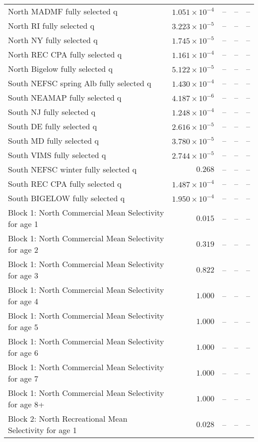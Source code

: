 \documentclass[
]{article}
\begin{document}
\begin{landscape}
\begin{longtable}[t]{lrrrr}
North MADMF fully selected q & $1.051\times 10^{-4}$ & -- & -- & --\\
North RI fully selected q & $3.223\times 10^{-5}$ & -- & -- & --\\
North NY fully selected q & $1.745\times 10^{-5}$ & -- & -- & --\\
\addlinespace
North REC CPA fully selected q & $1.161\times 10^{-4}$ & -- & -- & --\\
North Bigelow fully selected q & $5.122\times 10^{-5}$ & -- & -- & --\\
South NEFSC spring Alb fully selected q & $1.430\times 10^{-4}$ & -- & -- & --\\
South NEAMAP fully selected q & $4.187\times 10^{-6}$ & -- & -- & --\\
South NJ fully selected q & $1.248\times 10^{-4}$ & -- & -- & --\\
\addlinespace
South DE fully selected q & $2.616\times 10^{-5}$ & -- & -- & --\\
South MD fully selected q & $3.780\times 10^{-5}$ & -- & -- & --\\
South VIMS fully selected q & $2.744\times 10^{-5}$ & -- & -- & --\\
South NEFSC winter fully selected q & $0.268$ & -- & -- & --\\
South REC CPA fully selected q & $1.487\times 10^{-4}$ & -- & -- & --\\
\addlinespace
South BIGELOW fully selected q & $1.950\times 10^{-4}$ & -- & -- & --\\
Block 1: North Commercial Mean Selectivity for age 1 & $0.015$ & -- & -- & --\\
Block 1: North Commercial Mean Selectivity for age 2 & $0.319$ & -- & -- & --\\
Block 1: North Commercial Mean Selectivity for age 3 & $0.822$ & -- & -- & --\\
Block 1: North Commercial Mean Selectivity for age 4 & $1.000$ & -- & -- & --\\
\addlinespace
Block 1: North Commercial Mean Selectivity for age 5 & $1.000$ & -- & -- & --\\
Block 1: North Commercial Mean Selectivity for age 6 & $1.000$ & -- & -- & --\\
Block 1: North Commercial Mean Selectivity for age 7 & $1.000$ & -- & -- & --\\
Block 1: North Commercial Mean Selectivity for age 8+ & $1.000$ & -- & -- & --\\
Block 2: North Recreational Mean Selectivity for age 1 & $0.028$ & -- & -- & --\\

\end{longtable}
\end{landscape}
\end{document}
